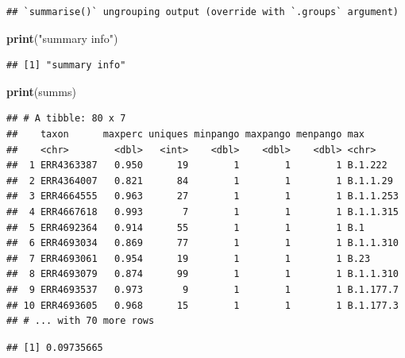 \documentclass[
]{article}
\newenvironment{Shaded}{\begin{snugshade}}{\end{snugshade}}
\newcommand{\DecValTok}[1]{\textcolor[rgb]{0.00,0.00,0.81}{#1}}
\newcommand{\KeywordTok}[1]{\textcolor[rgb]{0.13,0.29,0.53}{\textbf{#1}}}
\newcommand{\NormalTok}[1]{#1}
\newcommand{\OperatorTok}[1]{\textcolor[rgb]{0.81,0.36,0.00}{\textbf{#1}}}
\newcommand{\StringTok}[1]{\textcolor[rgb]{0.31,0.60,0.02}{#1}}
\begin{document}
\begin{verbatim}
## `summarise()` ungrouping output (override with `.groups` argument)
\end{verbatim}

\begin{Shaded}
\begin{Highlighting}[]
\KeywordTok{print}\NormalTok{(}\StringTok{"summary info"}\NormalTok{)}
\end{Highlighting}
\end{Shaded}

\begin{verbatim}
## [1] "summary info"
\end{verbatim}

\begin{Shaded}
\begin{Highlighting}[]
\KeywordTok{print}\NormalTok{(summs)}
\end{Highlighting}
\end{Shaded}

\begin{verbatim}
## # A tibble: 80 x 7
##    taxon      maxperc uniques minpango maxpango menpango max      
##    <chr>        <dbl>   <int>    <dbl>    <dbl>    <dbl> <chr>    
##  1 ERR4363387   0.950      19        1        1        1 B.1.222  
##  2 ERR4364007   0.821      84        1        1        1 B.1.1.29 
##  3 ERR4664555   0.963      27        1        1        1 B.1.1.253
##  4 ERR4667618   0.993       7        1        1        1 B.1.1.315
##  5 ERR4692364   0.914      55        1        1        1 B.1      
##  6 ERR4693034   0.869      77        1        1        1 B.1.1.310
##  7 ERR4693061   0.954      19        1        1        1 B.23     
##  8 ERR4693079   0.874      99        1        1        1 B.1.1.310
##  9 ERR4693537   0.973       9        1        1        1 B.1.177.7
## 10 ERR4693605   0.968      15        1        1        1 B.1.177.3
## # ... with 70 more rows
\end{verbatim}

\begin{Shaded}
\end{Shaded}

\begin{verbatim}
## [1] 0.09735665
\end{verbatim}
\end{document}
